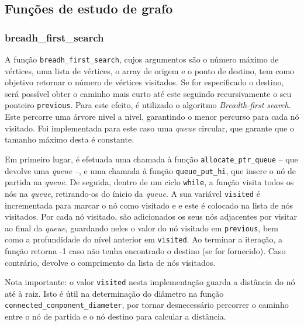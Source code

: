 \documentclass[portuguese,11pt,a4paper,titlepage]{article}
\newcommand{\foreign}[1]{\textit{#1}}
\begin{document}
\subsection{Funções de estudo de grafo}

\subsubsection{breadh\_first\_search}
A função \verb|breadh_first_search|, cujos argumentos são o número máximo de vértices, uma
lista de vértices, o array de origem e o ponto de destino, tem como objetivo retornar o
número de vértices visitados. Se for especificado o destino, será possível obter o 
caminho mais curto até este seguindo recursivamente o seu ponteiro \verb|previous|. Para
este efeito, é utilizado o algoritmo \textit{Breadth-first search}. Este percorre uma
árvore nivel a nivel, garantindo o menor percurso para cada nó visitado. Foi implementada para este caso
uma \foreign{queue} circular, que garante que o tamanho máximo desta é constante.

Em primeiro lugar, é efetuada uma chamada à função \verb|allocate_ptr_queue| -- que devolve
uma \textit{queue} --, e uma chamada à função \verb|queue_put_hi|, que insere o nó de partida
na \foreign{queue}. De seguida, dentro de um ciclo \verb|while|, a função visita todos os nós
na \foreign{queue}, retirando-os do ínicio da \foreign{queue}. A sua variável \verb|visited| é incrementada
para marcar o nó como visitado e e este é colocado na lista de nós visitados. Por cada nó visitado,
são adicionados os seus nós adjacentes por visitar ao final da \foreign{queue}, guardando neles
o valor do nó visitado em \verb|previous|, bem como a profundidade do nível anterior em \verb|visited|.
Ao terminar a iteração, a função retorna -1 caso não tenha encontrado o destino (se for fornecido). Caso
contrário, devolve o comprimento da lista de nós visitados.

Nota importante: o valor \verb|visited| nesta implementação guarda a distância do nó até à raiz. Isto é
útil na determinação do diâmetro na função \verb|connected_component_diameter|, por tornar desnecessário
percorrer o caminho entre o nó de partida e o nó destino para calcular a distância.
\end{document}
